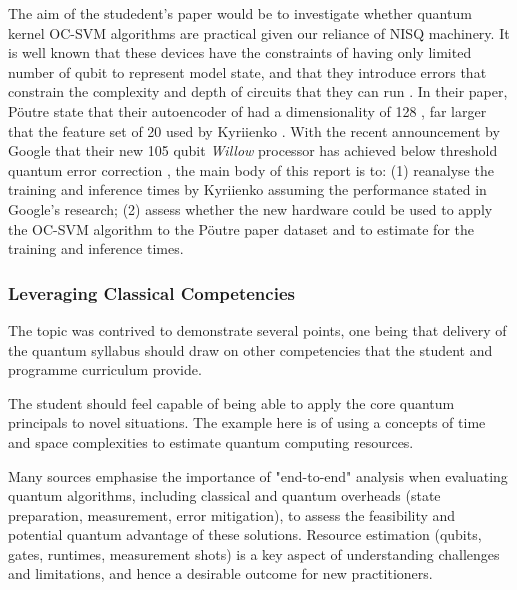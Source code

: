The aim of the studedent's paper would be to investigate whether quantum kernel OC-SVM algorithms are practical 
given our reliance of NISQ machinery.
It is well known that these devices have the constraints of having only limited number of qubit to represent model state,
and that they introduce errors that constrain the complexity and depth of circuits that they can run \cite{Preskill:2018}.
In their paper, P\"{o}utre state that their autoencoder of had a dimensionality of 128 \cite{Poutre:2024},
far larger that the feature set of 20 used by Kyriienko \cite{Kyriienko:2022}.
With the recent announcement by Google that their new 105 qubit \emph{Willow} processor has
achieved below threshold quantum error correction \cite{Google:Willow:2024}, the main body of this report is to: 
(1) reanalyse the training and inference times by Kyriienko assuming the performance stated in Google's research;
(2) assess whether the new hardware could be used to apply the OC-SVM algorithm to the P\"{o}utre paper dataset
and to estimate for the training and inference times.


\subsubsection{Leveraging Classical Competencies}
	
The topic was contrived to demonstrate several points,
one being that delivery of the quantum syllabus should draw on other competencies
that the student and programme curriculum provide.

The student should feel capable of being able to apply the core quantum principals to novel situations.  
The example here is of using a concepts of time and space complexities to estimate quantum computing resources.

Many sources emphasise the importance of "end-to-end" analysis when evaluating quantum \cite{Dalzell:2023} \cite{Morales:2025}
algorithms, including classical and quantum overheads (state preparation, measurement, error mitigation),
to assess the feasibility and potential quantum advantage of these solutions.  
Resource estimation (qubits, gates, runtimes, measurement shots) 
is a key aspect of understanding challenges and limitations,
and hence a desirable outcome for new practitioners.

